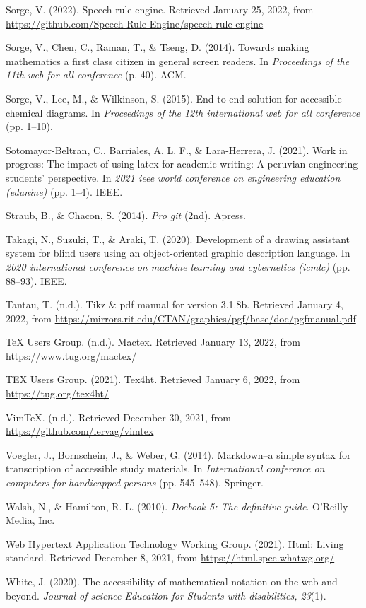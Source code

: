 \documentclass[11pt]{sig-alternate}
\begin{document}
\begin{large}
Sorge, V. (2022). Speech rule engine. Retrieved January 25, 2022, from \url{https://github.com/Speech-Rule-Engine/speech-rule-engine}

Sorge, V., Chen, C., Raman, T., \& Tseng, D. (2014). Towards making mathematics a first class citizen in general screen readers. In \textit{Proceedings of the 11th web for all conference }(p. 40). ACM. 

Sorge, V., Lee, M., \& Wilkinson, S. (2015). End-to-end solution for accessible chemical diagrams. In\textit{ Proceedings of the 12th international web for all conference }(pp. 1–10).

Sotomayor-Beltran, C., Barriales, A. L. F., \& Lara-Herrera, J. (2021). Work in progress: The impact of using latex for academic writing: A peruvian engineering students’ perspective. In \textit{2021 ieee world conference on engineering education (edunine)} (pp. 1–4). IEEE.

Straub, B., \& Chacon, S. (2014). \textit{Pro git} (2nd). Apress.

Takagi, N., Suzuki, T., \& Araki, T. (2020). Development of a drawing assistant system for blind users using an object-oriented graphic description language. In \textit{2020 international conference on machine learning and cybernetics (icmlc)} (pp. 88–93). IEEE.

Tantau, T. (n.d.). Tikz \& pdf manual for version 3.1.8b. Retrieved January 4, 2022, from \url{https://mirrors.rit.edu/CTAN/graphics/pgf/base/doc/pgfmanual.pdf}

TeX Users Group. (n.d.). Mactex. Retrieved January 13, 2022, from \url{https://www.tug.org/mactex/}

TEX Users Group. (2021). Tex4ht. Retrieved January 6, 2022, from \url{https://tug.org/tex4ht/}

VimTeX. (n.d.). Retrieved December 30, 2021, from \url{https://github.com/lervag/vimtex}

Voegler, J., Bornschein, J., \& Weber, G. (2014). Markdown–a simple syntax for transcription of accessible study materials. In \textit{International conference on computers for handicapped persons} (pp. 545–548). Springer.

Walsh, N., \& Hamilton, R. L. (2010). \textit{Docbook 5: The definitive guide}. O’Reilly Media, Inc.

Web Hypertext Application Technology Working Group. (2021). Html: Living standard. Retrieved December 8, 2021, from \url{https://html.spec.whatwg.org/}

White, J. (2020). The accessibility of mathematical notation on the web and beyond. \textit{Journal of science Education for Students with disabilities, 23}(1).


\end{large}
\end{document}
